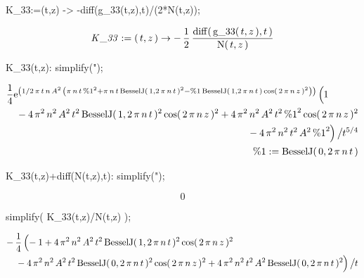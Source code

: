 \begin{mapleinput}
K_33:=(t,z) -> -diff(g_33(t,z),t)/(2*N(t,z));
\end{mapleinput}
\begin{maplelatex}
\[
{\it K\_33} := (\,{t}, {z}\,) \rightarrow  - \,{\displaystyle 
\frac {1}{2}}\,{\displaystyle \frac {{\rm diff}(\,{\rm g\_33}(\,{
t}, {z}\,), {t}\,)}{{\rm N}(\,{t}, {z}\,)}}
\]
\end{maplelatex}
\begin{mapleinput}
K_33(t,z): simplify(");
\end{mapleinput}
\begin{maplelatex}
\begin{eqnarray*}
\lefteqn{{\displaystyle \frac {1}{4}}{\rm e}^{ \left( \! \,1/2\,{
 \pi}\,{t}\,{n}\,{A}^{2}\, \left( \! \,{ \pi}\,{n}\,{t}\,{\rm \%1
}^{2} + { \pi}\,{n}\,{t}\,{\rm BesselJ}(\,1, 2\,{ \pi}\,{n}\,{t}
\,)^{2} - {\rm \%1}\,{\rm BesselJ}(\,1, 2\,{ \pi}\,{n}\,{t}\,)\,
{\rm cos}(\,2\,{ \pi}\,{n}\,{z}\,)^{2}\, \!  \right) \, \! 
 \right) } \left( {\vrule height0.44em width0em depth0.44em}
 \right. \! \! 1} \\
 & & \mbox{} - 4\,{ \pi}^{2}\,{n}^{2}\,{A}^{2}\,{t}^{2}\,{\rm 
BesselJ}(\,1, 2\,{ \pi}\,{n}\,{t}\,)^{2}\,{\rm cos}(\,2\,{ \pi}\,
{n}\,{z}\,)^{2} + 4\,{ \pi}^{2}\,{n}^{2}\,{A}^{2}\,{t}^{2}\,{\rm 
\%1}^{2}\,{\rm cos}(\,2\,{ \pi}\,{n}\,{z}\,)^{2} \\
 & & \mbox{} - 4\,{ \pi}^{2}\,{n}^{2}\,{t}^{2}\,{A}^{2}\,{\rm \%1
}^{2} \! \! \left. {\vrule height0.44em width0em depth0.44em}
 \right)  \left/ {\vrule height0.37em width0em depth0.37em}
 \right. \! \! {t}^{5/4} \\
 & & {\rm \%1} := {\rm BesselJ}(\,0, 2\,{ \pi}\,{n}\,{t}\,)
\end{eqnarray*}
\end{maplelatex}
\begin{mapleinput}
K_33(t,z)+diff(N(t,z),t): simplify(");
\end{mapleinput}
\begin{maplelatex}
\[
0
\]
\end{maplelatex}
\begin{mapleinput}
simplify( K_33(t,z)/N(t,z) );
\end{mapleinput}
\begin{maplelatex}
\begin{eqnarray*}
\lefteqn{ - \,{\displaystyle \frac {1}{4}} \left( {\vrule 
height0.44em width0em depth0.44em} \right. \! \!  - 1 + 4\,{ \pi}
^{2}\,{n}^{2}\,{A}^{2}\,{t}^{2}\,{\rm BesselJ}(\,1, 2\,{ \pi}\,{n
}\,{t}\,)^{2}\,{\rm cos}(\,2\,{ \pi}\,{n}\,{z}\,)^{2}} \\
 & & \mbox{} - 4\,{ \pi}^{2}\,{n}^{2}\,{A}^{2}\,{t}^{2}\,{\rm 
BesselJ}(\,0, 2\,{ \pi}\,{n}\,{t}\,)^{2}\,{\rm cos}(\,2\,{ \pi}\,
{n}\,{z}\,)^{2} + 4\,{ \pi}^{2}\,{n}^{2}\,{t}^{2}\,{A}^{2}\,{\rm 
BesselJ}(\,0, 2\,{ \pi}\,{n}\,{t}\,)^{2} \! \! \left. {\vrule 
height0.44em width0em depth0.44em} \right)  \left/ {\vrule 
height0.37em width0em depth0.37em} \right. \! \! {t}
\end{eqnarray*}
\end{maplelatex}

